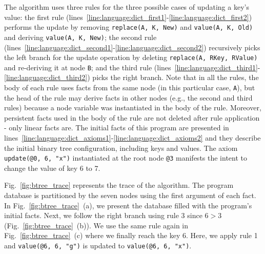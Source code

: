 The algorithm uses three rules for the three possible cases of updating a key's
value: the first rule
(lines~\ref{line:language:dict_first1}-\ref{line:language:dict_first2}) performs
the update by removing \texttt{replace(A, K, New)} and \texttt{value(A, K, Old)}
and deriving \texttt{value(A, K, New)}; the second rule
(lines~\ref{line:language:dict_second1}-\ref{line:language:dict_second2})
recursively picks the left branch for the update operation by deleting
\texttt{replace(A, RKey, RValue)} and re-deriving it at node \texttt{B}; and the
third rule
(lines~\ref{line:language:dict_third1}-\ref{line:language:dict_third2}) picks
the right branch. Note that in all the rules, the body of each rule uses facts
from the same node (in this particular case, \texttt{A}), but the head of the
rule may derive facts in other nodes (e.g., the second and third rules) because
a node variable was instantiated in the body of the rule. Moreover, persistent
facts used in the body of the rule are not deleted after rule application - only
linear facts are. The initial facts of this program are presented in
lines~\ref{line:language:dict_axioms1}-\ref{line:language:dict_axioms2} and they
describe the initial binary tree configuration, including keys and values.  The
axiom \texttt{update(@0, 6, "x")} instantiated at the root node \texttt{@3}
manifests the intent to change the value of key 6 to 7.

Fig.~\ref{fig:btree_trace} represents the trace of the algorithm. The program
database is partitioned by the seven nodes using the first argument of each
fact. In Fig.~\ref{fig:btree_trace}~(a), we present the database filled with the
program's initial facts. Next, we follow the right branch using rule 3 since $6 > 3$
(Fig.~\ref{fig:btree_trace}~(b)).  We use the same rule again in
Fig.~\ref{fig:btree_trace}~(c) where we finally reach the key 6. Here, we apply
rule 1 and \texttt{value(@6, 6, "g")} is updated to \texttt{value(@6, 6, "x")}.

